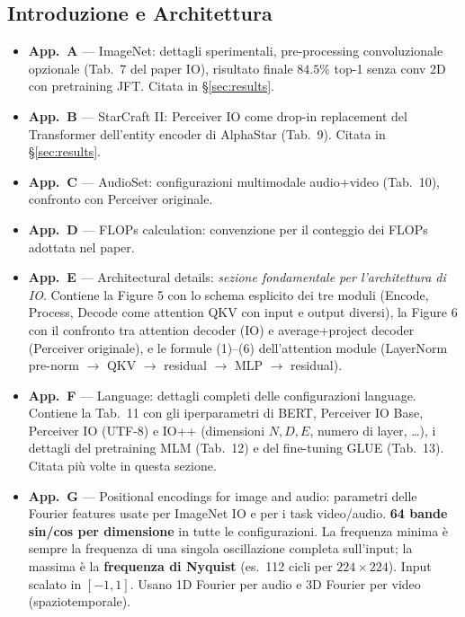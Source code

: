 \documentclass[
  11pt,
]{article}
\begin{document}
\subsection{Introduzione e Architettura}

\begin{notabox}[title={\textbf{Mappa delle appendici del paper Perceiver IO (Jaegle et al., 2022)}}]
\begin{itemize}\setlength\itemsep{0.1em}
\item \textbf{App.\ A} --- ImageNet: dettagli sperimentali, pre-processing convoluzionale opzionale (Tab.\ 7 del paper IO), risultato finale $84.5\%$ top-1 senza conv 2D con pretraining JFT. Citata in \S\ref{sec:results}.
\item \textbf{App.\ B} --- StarCraft II: Perceiver IO come drop-in replacement del Transformer dell'entity encoder di AlphaStar (Tab.\ 9). Citata in \S\ref{sec:results}.
\item \textbf{App.\ C} --- AudioSet: configurazioni multimodale audio+video (Tab.\ 10), confronto con Perceiver originale.
\item \textbf{App.\ D} --- FLOPs calculation: convenzione per il conteggio dei FLOPs adottata nel paper.
\item \textbf{App.\ E} --- Architectural details: \emph{sezione fondamentale per l'architettura di IO}. Contiene la Figure 5 con lo schema esplicito dei tre moduli (Encode, Process, Decode come attention QKV con input e output diversi), la Figure 6 con il confronto tra attention decoder (IO) e average+project decoder (Perceiver originale), e le formule (1)--(6) dell'attention module (LayerNorm pre-norm $\to$ QKV $\to$ residual $\to$ MLP $\to$ residual).
\item \textbf{App.\ F} --- Language: dettagli completi delle configurazioni language. Contiene la Tab.\ 11 con gli iperparametri di BERT, Perceiver IO Base, Perceiver IO (UTF-8) e IO++ (dimensioni $N, D, E$, numero di layer, \ldots), i dettagli del pretraining MLM (Tab.\ 12) e del fine-tuning GLUE (Tab.\ 13). Citata più volte in questa sezione.
\item \textbf{App.\ G} --- Positional encodings for image and audio: parametri delle Fourier features usate per ImageNet IO e per i task video/audio. \textbf{64 bande sin/cos per dimensione} in tutte le configurazioni. La frequenza minima è sempre la frequenza di una singola oscillazione completa sull'input; la massima è la \textbf{frequenza di Nyquist} (es.\ 112 cicli per $224 \times 224$). Input scalato in $[-1, 1]$. Usano 1D Fourier per audio e 3D Fourier per video (spaziotemporale).

\end{itemize}
\end{notabox}
\end{document}
